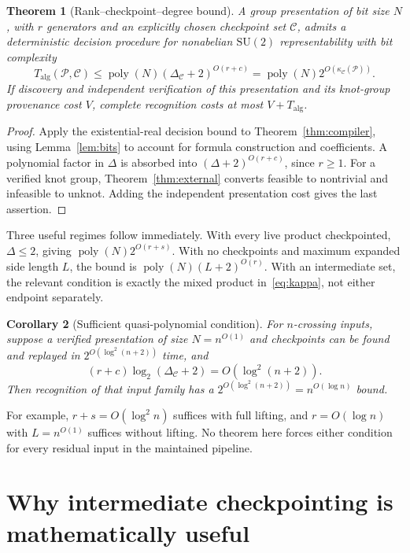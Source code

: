 \documentclass[11pt]{article}
\newtheorem{theorem}{Theorem}[section]
\newtheorem{corollary}[theorem]{Corollary}
\theoremstyle{definition}
\theoremstyle{remark}
\newcommand{\SU}{\mathrm{SU}(2)}
\newcommand{\poly}{\operatorname{poly}}
\newcommand{\calC}{\mathcal C}
\newcommand{\calP}{\mathcal P}
\begin{document}
\begin{theorem}[Rank--checkpoint--degree bound]
\label{thm:complexity}
A group presentation of bit size $N$, with $r$ generators and an explicitly chosen checkpoint set $\calC$, admits a deterministic decision procedure for nonabelian $\SU$ representability with bit complexity
\begin{equation}
T_{\mathrm{alg}}(\calP,\calC)
\le \poly(N)(\Delta_{\calC}+2)^{O(r+c)}
=\poly(N)2^{O(\kappa_{\calC}(\calP))}.
\label{eq:mainbound}
\end{equation}
If discovery and independent verification of this presentation and its knot-group provenance cost $V$, complete recognition costs at most $V+T_{\mathrm{alg}}$.
\end{theorem}
\begin{proof}
Apply the existential-real decision bound to Theorem~\ref{thm:compiler}, using Lemma~\ref{lem:bits} to account for formula construction and coefficients. A polynomial factor in $\Delta$ is absorbed into $(\Delta+2)^{O(r+c)}$, since $r\ge1$. For a verified knot group, Theorem~\ref{thm:external} converts feasible to nontrivial and infeasible to unknot. Adding the independent presentation cost gives the last assertion.
\end{proof}

Three useful regimes follow immediately. With every live product checkpointed, $\Delta\le2$, giving $\poly(N)2^{O(r+s)}$. With no checkpoints and maximum expanded side length $L$, the bound is $\poly(N)(L+2)^{O(r)}$. With an intermediate set, the relevant condition is exactly the mixed product in~\eqref{eq:kappa}, not either endpoint separately.

\begin{corollary}[Sufficient quasi-polynomial condition]
\label{cor:qp}
For $n$-crossing inputs, suppose a verified presentation of size $N=n^{O(1)}$ and checkpoints can be found and replayed in $2^{O(\log^2(n+2))}$ time, and
\[
(r+c)\log_2(\Delta_{\calC}+2)=O(\log^2(n+2)).
\]
Then recognition of that input family has a $2^{O(\log^2(n+2))}=n^{O(\log n)}$ bound.
\end{corollary}
For example, $r+s=O(\log^2 n)$ suffices with full lifting, and $r=O(\log n)$ with $L=n^{O(1)}$ suffices without lifting. No theorem here forces either condition for every residual input in the maintained pipeline.

\section{Why intermediate checkpointing is mathematically useful}
\label{sec:checkpoints}
\end{document}
